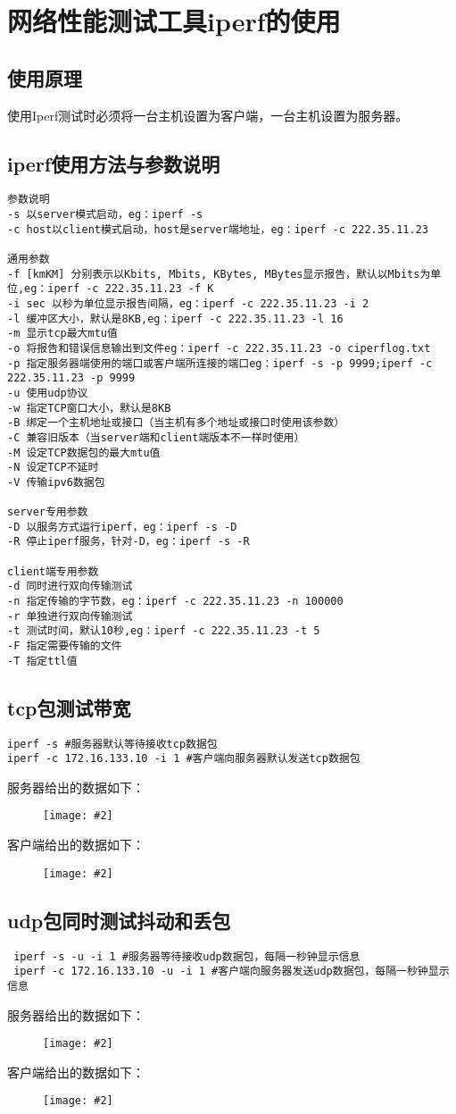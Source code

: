 \documentclass[a4paper,left=1.5cm,right=1.5cm,11pt]{article}
\newcommand{\sizedfic}[2]{\begin{figure}[H]
		\center
		\texttt{[image: \#2]}
	\end{figure}}
\begin{document}
\section{网络性能测试工具iperf的使用}
\subsection{使用原理}
使用Iperf测试时必须将一台主机设置为客户端，一台主机设置为服务器。
\subsection{iperf使用方法与参数说明}
\begin{lstlisting}
参数说明
-s 以server模式启动，eg：iperf -s
-c host以client模式启动，host是server端地址，eg：iperf -c 222.35.11.23
 
通用参数
-f [kmKM] 分别表示以Kbits, Mbits, KBytes, MBytes显示报告，默认以Mbits为单位,eg：iperf -c 222.35.11.23 -f K
-i sec 以秒为单位显示报告间隔，eg：iperf -c 222.35.11.23 -i 2
-l 缓冲区大小，默认是8KB,eg：iperf -c 222.35.11.23 -l 16
-m 显示tcp最大mtu值
-o 将报告和错误信息输出到文件eg：iperf -c 222.35.11.23 -o ciperflog.txt
-p 指定服务器端使用的端口或客户端所连接的端口eg：iperf -s -p 9999;iperf -c 222.35.11.23 -p 9999
-u 使用udp协议
-w 指定TCP窗口大小，默认是8KB
-B 绑定一个主机地址或接口（当主机有多个地址或接口时使用该参数）
-C 兼容旧版本（当server端和client端版本不一样时使用）
-M 设定TCP数据包的最大mtu值
-N 设定TCP不延时
-V 传输ipv6数据包
 
server专用参数
-D 以服务方式运行iperf，eg：iperf -s -D
-R 停止iperf服务，针对-D，eg：iperf -s -R
 
client端专用参数
-d 同时进行双向传输测试
-n 指定传输的字节数，eg：iperf -c 222.35.11.23 -n 100000
-r 单独进行双向传输测试
-t 测试时间，默认10秒,eg：iperf -c 222.35.11.23 -t 5
-F 指定需要传输的文件
-T 指定ttl值
\end{lstlisting}
\subsection{tcp包测试带宽}
\begin{lstlisting}
iperf -s #服务器默认等待接收tcp数据包
iperf -c 172.16.133.10 -i 1 #客户端向服务器默认发送tcp数据包
\end{lstlisting}
服务器给出的数据如下：
\sizedfic{0.8}{iperf_tcp.png}
客户端给出的数据如下：
\sizedfic{0.8}{iperf_tcp2.png}
\subsection{udp包同时测试抖动和丢包}
\begin{lstlisting}
 iperf -s -u -i 1 #服务器等待接收udp数据包，每隔一秒钟显示信息
 iperf -c 172.16.133.10 -u -i 1 #客户端向服务器发送udp数据包，每隔一秒钟显示信息
\end{lstlisting}
服务器给出的数据如下：
\sizedfic{0.8}{iperf_udp1.png}
客户端给出的数据如下：
\sizedfic{0.8}{iperf_udp2.png}
\end{document}
